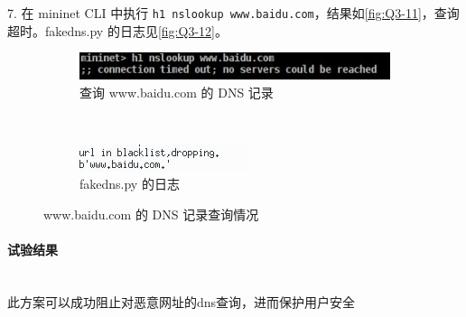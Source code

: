 \documentclass[format=draft,language=chinese,category=SDN]{hustreport}
\newcommand{\myparagraph}[1]{\paragraph{#1}\mbox{}\\}
\newcommand{\code}{\texttt}
\begin{document}
7. 在 mininet CLI 中执行 \code{h1 nslookup www.baidu.com}，结果如\autoref{fig:Q3-11}，查询超时。fakedns.py 的日志见\autoref{fig:Q3-12}。
\begin{figure}[!h]
\centering
  \begin{subfigure}[b]{0.48\textwidth}
  \includegraphics[width=\textwidth]{fig/3_11}
  \caption{查询 www.baidu.com 的 DNS 记录}\label{fig:Q3-11}
  \end{subfigure}
  ~
  \begin{subfigure}[b]{0.48\textwidth}
  \includegraphics[width=\textwidth]{fig/3_12}
  \caption{fakedns.py 的日志}\label{fig:Q3-12}
  \end{subfigure}
\caption{www.baidu.com 的 DNS 记录查询情况}\label{fig:Q3-S3}
\end{figure}

\myparagraph{试验结果}

此方案可以成功阻止对恶意网址的dns查询，进而保护用户安全
\clearpage

\backmatter






\end{document}
